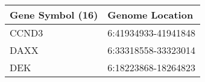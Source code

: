 \begin{tabular}{ll}
\toprule
Gene Symbol (16) &     Genome Location \\
\midrule
           CCND3 & 6:41934933-41941848 \\
            DAXX & 6:33318558-33323014 \\
             DEK & 6:18223868-18264823 \\
\bottomrule
\end{tabular}

